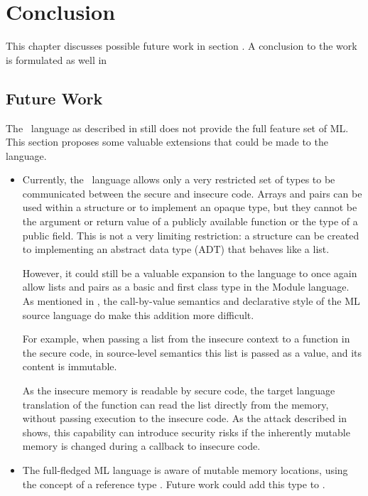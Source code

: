 \chapter{Conclusion}
This chapter discusses possible future work in section .
A conclusion to the work is formulated as well in 
\section{Future Work}
\label{sec:FutureWork}
The \MiniML\ language as described in  still does not provide the full feature set of ML. This section proposes some valuable extensions that could be made to the language.

\begin{itemize}
\item
Currently, the \MiniML\ language allows only a very restricted set of types to be communicated between the secure and insecure code. 
Arrays and pairs can be used within a structure or to implement an opaque type, but they cannot be the argument or return value of a publicly available function or the type of a public field.
This is not a very limiting restriction: a structure can be created to implementing an abstract data type (ADT) that behaves like a list.

However, it could still be a valuable expansion to the language to once again allow lists and pairs as a basic and first class type in the Module language.
As mentioned in , the call-by-value semantics and declarative style of the ML source language do make this addition more difficult.

For example, when passing a list from the insecure context to a function in the secure code, in source-level semantics this list is passed as a value, and its content is immutable.

As the insecure memory is readable by secure code, the target language translation of the function can read the list directly from the memory, without passing execution to the insecure code.
As the attack described in  shows, this capability can introduce security risks if the inherently mutable  memory is changed during a callback to insecure code.
\item
The full-fledged ML language is aware of mutable memory locations, using the concept of a reference type .
Future work could add this type to \MiniML.


\end{itemize}
